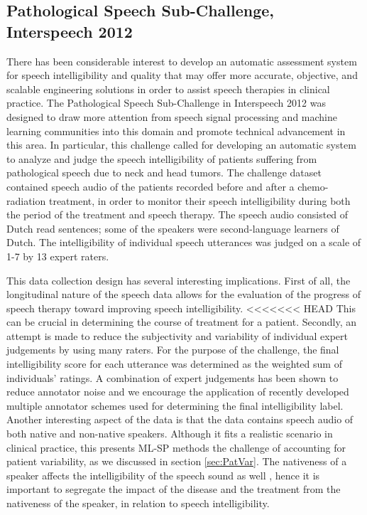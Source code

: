 \documentclass{article}
\begin{document}
\subsection{Pathological Speech Sub-Challenge, Interspeech 2012}
There has been considerable interest to develop an automatic assessment system for speech intelligibility and quality that may offer more accurate, objective, and scalable engineering solutions in order to assist speech therapies in clinical practice. The Pathological Speech Sub-Challenge in Interspeech 2012 was designed to draw more attention from speech signal processing and machine learning communities into this domain and promote technical advancement in this area.
In particular, this challenge called for developing an automatic system to analyze and judge the speech intelligibility of patients suffering from pathological speech due to neck and head tumors. The challenge dataset contained speech audio of the patients recorded before and after a chemo-radiation treatment, in order to monitor their speech intelligibility during both the period of the treatment and speech therapy.
The speech audio consisted of Dutch read sentences; some of the speakers were second-language learners of Dutch. The intelligibility of individual speech utterances was judged on a scale of 1-7 by 13 expert raters.

This data collection design has several interesting implications. First of all, the longitudinal nature of the speech data allows for the evaluation of the progress of speech therapy toward improving speech intelligibility.
<<<<<<< HEAD
This can be crucial in determining the course of treatment for a patient. Secondly, an attempt is made to reduce the subjectivity and variability of individual expert judgements by using many raters. For the purpose of the challenge, the final intelligibility score for each utterance was determined as the weighted sum of individuals' ratings. A combination of expert judgements has been shown to reduce annotator noise \cite{kuncheva2004combining} and we encourage the application of recently developed multiple annotator schemes \cite{audhkhasi2013globally} used for determining the final intelligibility label. 
Another interesting aspect of the data is that the data contains speech audio of both native and non-native speakers. Although it fits a realistic scenario in clinical practice, this presents ML-SP methods the challenge of accounting for patient variability, as we discussed in section \ref{sec:PatVar}. The nativeness of a speaker affects the intelligibility of the speech sound as well \cite{van2001intelligibility}, hence it is important to segregate the impact of the disease and the treatment from the nativeness of the speaker, in relation to speech intelligibility.
\end{document}
